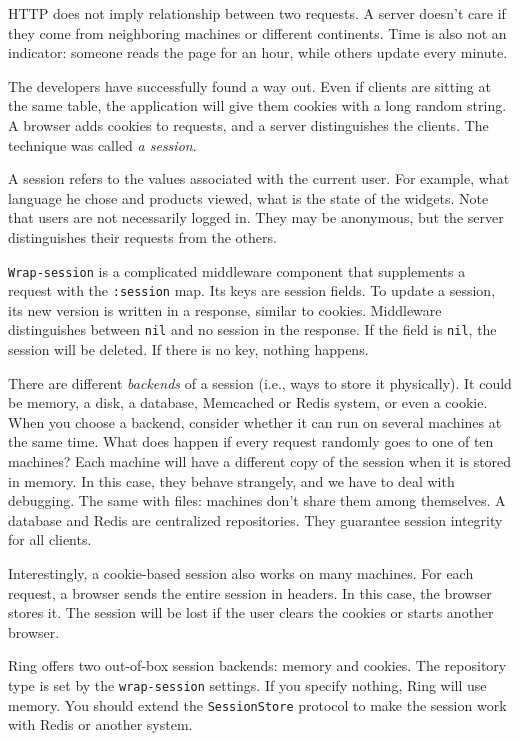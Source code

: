 HTTP does not imply relationship between two requests. A server doesn't care if they come from neighboring machines or different continents. Time is also not an indicator: someone reads the page for an hour, while others update every minute.

The developers have successfully found a way out. Even if clients are sitting at the same table, the application will give them cookies with a long random string. A browser adds cookies to requests, and a server distinguishes the clients. The technique was called \emph{a session}.

A session refers to the values associated with the current user. For example, what language he chose and products viewed, what is the state of the widgets. Note that users are not necessarily logged in. They may be anonymous, but the server distinguishes their requests from the others.


\verb|Wrap-session| is a complicated middleware component that supplements a request with the \verb|:session| map. Its keys are session fields. To update a session, its new version is written in a response, similar to cookies. Middleware distinguishes between \verb|nil| and no session in the response. If the field is \verb|nil|, the session will be deleted. If there is no key, nothing happens.


There are different \emph{backends} of a session (i.e., ways to store it physically). It could be memory, a disk, a database, Memcached or Redis system, or even a cookie. When you choose a backend, consider whether it can run on several machines at the same time. What does happen if every request randomly goes to one of ten machines? Each machine will have a different copy of the session when it is stored in memory. In this case, they behave strangely, and we have to deal with debugging. The same with files: machines don't share them among themselves. A database and Redis are centralized repositories. They guarantee session integrity for all clients.

Interestingly, a cookie-based session also works on many machines. For each request, a browser sends the entire session in headers. In this case, the browser stores it. The session will be lost if the user clears the cookies or starts another browser.

Ring offers two out-of-box session backends: memory and cookies. The repository type is set by the \verb|wrap-session| settings. If you specify nothing, Ring will use memory. You should extend the \verb|SessionStore| protocol to make the session work with Redis or another system.

